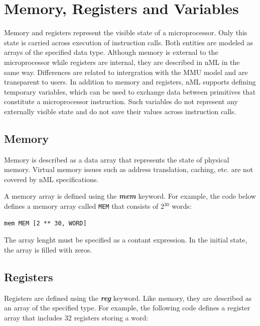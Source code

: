 \documentclass[oneside,final,14pt]{extreport}
\begin{document}

\section{Memory, Registers and Variables}

Memory and registers represent the visible state of a microprocessor. Only this state is carried
across execution of instruction calls. Both entities are modeled as arrays of the specified
data type. Although memory is external to the microprocessor while registers are internal, they
are described in nML in the same way. Differences are related to intergration with the MMU model
and are transparent to users.
In addition to memory and registers, nML supports defining temporary variables, which can be used
to exchange data between primitives that constitute a microprocessor instruction. Such variables
do not represent any externally visible state and do not save their values across instruction
calls.

\subsection{Memory}

Memory is described as a data array that represents the state of physical memory. Virtual memory
issues such as address translation, caching, etc. are not covered by nML specifications.

A memory array is defined using the \textbf{\textit{mem}} keyword. For example, the code below
defines a memory array called {\tt MEM} that consists of 2$^{30}$ words:

\begin{lstlisting}
mem MEM [2 ** 30, WORD]
\end{lstlisting}

The array lenght must be specified as a contant expression. In the initial state, the array is
filled with zeros.

\subsection{Registers}

Registers are defined using the \textbf{\textit{reg}} keyword. Like memory, they are described
as an array of the specified type. For example, the following code defines a register array that
includes 32 registers storing a word:
\end{document}
